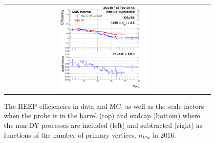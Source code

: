 \begin{figure}[bh]
\begin{center}
\begin{tabular}{cc}
      \includegraphics[width=0.45\textwidth]{figures/Zprime/2016/ScaleFactor/SameSign/nominal/g_compare_cut_nVtx_Endcap_ea_ta_exc_AS_nominal_PUW.png}
    \end{tabular}
    \caption{The HEEP efficiencies in data and MC, as well as the scale factors when the probe is in the barrel (top) and endcap (bottom) where the non-DY processes are included (left) and subtracted (right) as functions of the number of primary vertices, $n_{Vtx}$ in 2016.}
    \label{fig:eff_SS_nominal_nVtx_2016}
  \end{center}
\end{figure}


